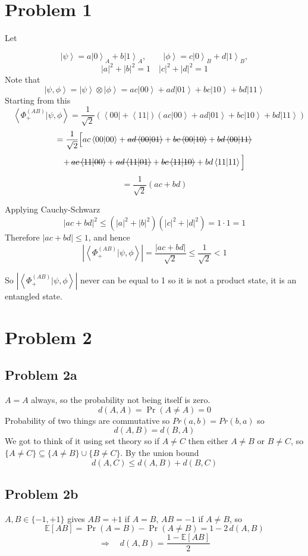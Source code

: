 \documentclass[
]{article}
\author{}
\date{}
\date{\today}
\newcommand{\cancel}[1]{\text{\sout{\ensuremath{#1}}}}
\providecommand{\ket}[1]{\left\lvert #1 \right\rangle}
\providecommand{\bra}[1]{\left\langle #1 \right\rvert}
\providecommand{\braket}[1]{\left\langle #1 \right\rangle}
\providecommand{\Rarr}{\Rightarrow}
\begin{document}
\section*{Problem 1}
Let

\[
	\ket{\psi}=a\ket{0}_A+b\ket{1}_A,\qquad \ket{\phi}=c\ket{0}_B+d\ket{1}_B,
\]
\[
	|a|^2+|b|^2=1\quad |c|^2+|d|^2=1
\]
Note that
\[
	\ket{\psi,\phi}=\ket{\psi}\otimes\ket{\phi}=ac\ket{00}+ad\ket{01}+bc\ket{10}+bd\ket{11}
\]
Starting from this
\[
	\quad \braket{\Phi_+^{(AB)}|\psi,\phi}=\frac{1}{\sqrt{2}}\left(\bra{00}+\bra{11}\right)\left(ac\ket{00}+ad\ket{01}+bc\ket{10}+bd\ket{11}\right)
\]
\[
	=\frac{1}{\sqrt{2}}\Big[
	ac\braket{00|00}+\cancel{ad\braket{00|01}}+\cancel{bc\braket{00|10}}+\cancel{bd\braket{00|11}}
\]
\[
	+\,\cancel{ac\braket{11|00}}+\cancel{ad\braket{11|01}}+\cancel{bc\braket{11|10}}+bd\braket{11|11}\Big]
\]
\[
	=\frac{1}{\sqrt{2}}\left(ac+bd\right)
\]

Applying Cauchy-Schwarz
\[
	\left|ac+bd\right|^2 \leq \left(|a|^2+|b|^2\right)\left(|c|^2+|d|^2\right)=1\cdot 1 = 1
\]
Therefore $\left|ac+bd\right|\leq 1$, and hence
\[
	\left|\braket{\Phi_+^{(AB)}|\psi,\phi}\right|=\frac{|ac+bd|}{\sqrt{2}}\leq\frac{1}{\sqrt{2}}<1
\]

So $\left|\braket{\Phi_+^{(AB)}|\psi,\phi}\right|$ never can be equal to 1 so it is not a product state, it is an entangled state.

\section*{Problem 2}

\subsection*{Problem 2a}
$A=A$ always, so the probability not being itself is zero.
\[
	d(A,A)=\Pr(A\neq A)=0
\]
Probability of two things are commutative so $Pr(a,b)=Pr(b,a)$ so
\[
	d(A,B)=d(B,A)
\]
We got to think of it using set theory so if $A\neq C$ then either $A\neq B$ or $B\neq C$, so $\{A\neq C\}\subseteq\{A\neq B\}\cup\{B\neq C\}$. By the union bound
\[
	d(A,C)\leq d(A,B)+d(B,C)
\]

\subsection*{Problem 2b}
$A,B\in\{-1,+1\}$ gives $AB=+1$ if $A=B$, $AB=-1$ if $A\neq B$, so
\[
	\mathbb{E}[AB]=\Pr(A=B)-\Pr(A\neq B)=1-2\,d(A,B)
\]
\[
	\Rarr\quad d(A,B)=\frac{1-\mathbb{E}[AB]}{2}
\]
\end{document}
